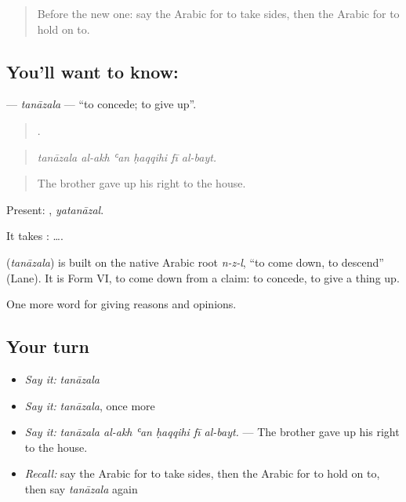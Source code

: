 \label{lesson:AR-C373-tanazala}



\begin{quote}
Before the new one: say the Arabic for to take sides, then the Arabic for to hold on to.
\end{quote}

\subsection*{You'll want to know: }
\textbf{} — \emph{tanāzala} — \textquotedblleft{}to concede; to give up\textquotedblright{}.

\begin{quote}
     .
\end{quote}

\begin{quote}
\emph{tanāzala al-akh ʿan ḥaqqihi fī al-bayt.}
\end{quote}

\begin{quote}
The brother gave up his right to the house.
\end{quote}

Present: , \emph{yatanāzal}.

It takes :   ….

\begin{cousinweb}
\textbf{} (\emph{tanāzala}) is built on the native Arabic root \emph{n-z-l}, \textquotedblleft{}to come down, to descend\textquotedblright{} (Lane). It is Form VI, to come down from a claim: to concede, to give a thing up.
\end{cousinweb}

\begin{grammarlens}[title={What you've built}]
One more word for giving reasons and opinions.
\end{grammarlens}

\subsection*{Your turn}
\begin{itemize}
\raggedright
  \item \emph{Say it:} \emph{tanāzala}
  \item \emph{Say it:} \emph{tanāzala}, once more
  \item \emph{Say it:} \emph{tanāzala al-akh ʿan ḥaqqihi fī al-bayt.} — The brother gave up his right to the house.
  \item \emph{Recall:} say the Arabic for to take sides, then the Arabic for to hold on to, then say \emph{tanāzala} again
\end{itemize}

